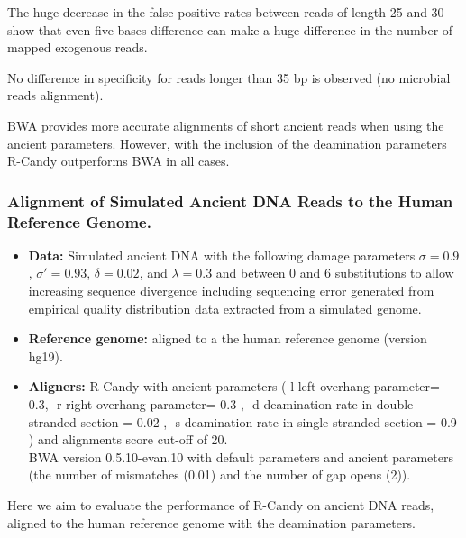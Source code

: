 \documentclass[11pt,a4paper]{report}
\begin{document}
The huge decrease in the false positive rates between reads of length 
25 and 30 show that even five bases difference can make a huge 
difference in the number of mapped exogenous reads.


No difference in specificity for reads longer than 35 bp is observed
(no microbial reads alignment).


BWA provides more accurate alignments of short 
ancient reads when using the ancient parameters. 
However, with the inclusion of the deamination parameters R-Candy 
outperforms BWA in all cases.



\subsubsection{Alignment of Simulated Ancient DNA Reads to the Human Reference Genome.}
\label{Alignment of Simulated Ancient DNA Reads to the Human Reference Genome.}
 
 \begin{itemize}
 
    \item \textbf{Data:} Simulated ancient DNA 
     with the following damage parameters $ \sigma = 0.9$, 
    $ \sigma\prime = 0.93 $, $\delta = 0.02 $,  and $\lambda = 0.3 $ and 
    between 0 and 6 substitutions to allow increasing sequence divergence
    including sequencing error generated from empirical quality distribution data
    extracted from a simulated genome.
  
   \item \textbf{Reference genome:} aligned to a the human reference genome (version hg19).

 
    \item \textbf{Aligners:} 
R-Candy with ancient parameters 
(-l left overhang parameter= 0.3, -r right overhang parameter= 0.3 , 
-d deamination rate in double stranded section = 0.02 , 
-s deamination rate in single stranded section = 0.9 )
 and alignments score cut-off of 20. \\
BWA version 0.5.10-evan.10 with default parameters and ancient parameters 
\cite{green2010draft} (the number of mismatches 
(0.01) and the number of gap opens (2)).
 
  \end{itemize}
 

Here we aim to evaluate the performance of R-Candy on ancient DNA reads, 
aligned to the human reference genome with the deamination parameters.
\end{document}

